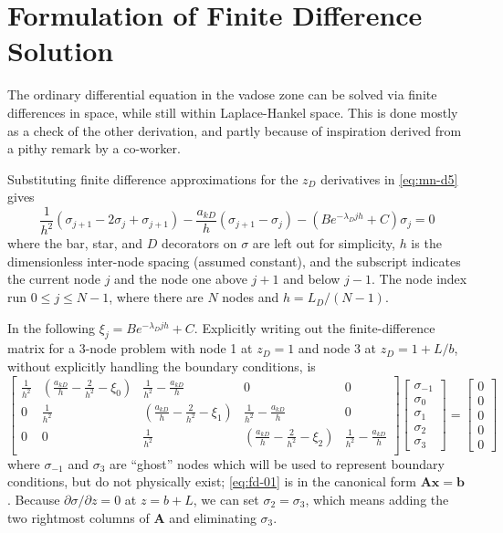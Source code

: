 \documentclass[12pt,letterpaper]{article}
\begin{document}
\section{Formulation of Finite Difference Solution}
The ordinary differential equation in the vadose zone can be solved
via finite differences in space, while still within Laplace-Hankel
space.  This is done mostly as a check of the other derivation, and
partly because of inspiration derived from a pithy remark by a
co-worker.

Substituting finite difference approximations for the $z_D$
derivatives in \eqref{eq:mn-d5} gives
\begin{equation}
  \nonumber
  \frac{1}{h^2} \left( \sigma_{j+1} - 2 \sigma_j + \sigma_{j+1}
  \right) - \frac{a_{kD}}{h} \left( \sigma_{j+1} - \sigma_j\right) -
  \left( B e^{-\lambda_D jh} + C \right) \sigma_j
  = 0
\end{equation}
where the bar, star, and $D$ decorators on $\sigma$ are left out for
simplicity, $h$ is the dimensionless inter-node spacing (assumed
constant), and the subscript indicates the current node $j$ and the
node one above $j+1$ and below $j-1$.  The node index run $0 \le j \le
N-1$, where there are $N$ nodes and $h = L_D / (N - 1)$.

In the following $\xi_j = B e^{-\lambda_D jh} + C$.  Explicitly
writing out the finite-difference matrix for a 3-node problem with
node 1 at $z_D=1$ and node 3 at $z_D=1+L/b$, without explicitly
handling the boundary conditions, is
\begin{equation}
  \label{eq:fd-01}
  \left[ \begin{matrix}
    \frac{1}{h^2} & \left(\frac{a_{kD}}{h} - \frac{2}{h^2} - \xi_0\right) &
    \frac{1}{h^2} - \frac{a_{kD}}{h} & 0 & 0 \\
    0 & \frac{1}{h^2} & \left(\frac{a_{kD}}{h} - \frac{2}{h^2} - \xi_1 \right)&
    \frac{1}{h^2} - \frac{a_{kD}}{h} & 0  \\
    0 & 0 & \frac{1}{h^2} & \left(\frac{a_{kD}}{h} - \frac{2}{h^2}  -
      \xi_2 \right) &
    \frac{1}{h^2} - \frac{a_{kD}}{h} \\
  \end{matrix}\right]
\left[\begin{matrix}
\sigma_{-1} \\ \sigma_0 \\ \sigma_1 \\ \sigma_2 \\ \sigma_3
\end{matrix}\right]
=
\left[\begin{matrix}
0 \\ 0\\ 0 \\ 0 \\ 0
\end{matrix}\right]
\end{equation}
where $\sigma_{-1}$ and $\sigma_3$ are ``ghost'' nodes which will be
used to represent boundary conditions, but do not physically exist;
\eqref{eq:fd-01} is in the canonical form $\mathbf{Ax}=\mathbf{b}$.
Because $\partial \sigma/\partial z =0$ at $z = b+L$, we can set
$\sigma_2= \sigma_3$, which means adding the two rightmost columns of
$\mathbf{A}$ and eliminating $\sigma_3$.
\end{document}
